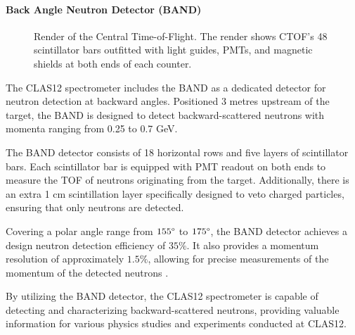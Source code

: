 \paragraph{Back Angle Neutron Detector (BAND)}
    \begin{figure}
        \centering{}
        \caption[Central Time-of-Flight]{Render of the Central Time-of-Flight.
        The render shows CTOF's 48 scintillator bars outfitted with light guides, PMTs, and magnetic shields at both ends of each counter.}
        \label{fig::ctof}
    \end{figure}

    The CLAS12 spectrometer includes the BAND as a dedicated detector for neutron detection at backward angles.
    Positioned 3 metres upstream of the target, the BAND is designed to detect backward-scattered neutrons with momenta ranging from 0.25 to 0.7 GeV.

    The BAND detector consists of 18 horizontal rows and five layers of scintillator bars.
    Each scintillator bar is equipped with PMT readout on both ends to measure the TOF of neutrons originating from the target.
    Additionally, there is an extra 1 cm scintillation layer specifically designed to veto charged particles, ensuring that only neutrons are detected.

    Covering a polar angle range from $155\degree$ to $175\degree$, the BAND detector achieves a design neutron detection efficiency of $35\%$.
    It also provides a momentum resolution of approximately $1.5\%$, allowing for precise measurements of the momentum of the detected neutrons \cite{segarra2020}.

    By utilizing the BAND detector, the CLAS12 spectrometer is capable of detecting and characterizing backward-scattered neutrons, providing valuable information for various physics studies and experiments conducted at CLAS12.

